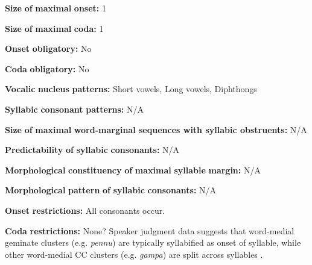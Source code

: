 \documentclass[output=paper]{langsci/langscibook}
\begin{document}
\begin{styleBody}
\textbf{Size} \textbf{of} \textbf{maximal} \textbf{onset:} 1
\end{styleBody}

\begin{styleBody}
\textbf{Size} \textbf{of} \textbf{maximal} \textbf{coda:} 1
\end{styleBody}

\begin{styleBody}
\textbf{Onset} \textbf{obligatory:} No
\end{styleBody}

\begin{styleBody}
\textbf{Coda} \textbf{obligatory:} No
\end{styleBody}

\begin{styleBody}
\textbf{Vocalic} \textbf{nucleus} \textbf{patterns:} Short vowels, Long vowels, Diphthongs
\end{styleBody}

\begin{styleBody}
\textbf{Syllabic} \textbf{consonant} \textbf{patterns:} N/A
\end{styleBody}

\begin{styleBody}
\textbf{Size} \textbf{of} \textbf{maximal} \textbf{word{}-marginal sequences with syllabic obstruents:} N/A
\end{styleBody}

\begin{styleBody}
\textbf{Predictability} \textbf{of} \textbf{syllabic} \textbf{consonants:} N/A
\end{styleBody}

\begin{styleBody}
\textbf{Morphological} \textbf{constituency} \textbf{of} \textbf{maximal} \textbf{syllable} \textbf{margin:} N/A
\end{styleBody}

\begin{styleBody}
\textbf{Morphological} \textbf{pattern} \textbf{of} \textbf{syllabic} \textbf{consonants:} N/A
\end{styleBody}

\begin{styleBody}
\textbf{Onset} \textbf{restrictions:} All consonants occur. 
\end{styleBody}

\begin{styleBody}
\textbf{Coda} \textbf{restrictions:} None? Speaker judgment data suggests that word-medial geminate clusters (e.g. \textit{pennu}) are typically syllabified as onset of syllable, while other word-medial CC clusters (e.g. \textit{gampa}) are split across syllables \citep{Sailaja1999}.
\end{styleBody}
\end{document}
